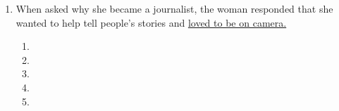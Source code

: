 \begin{enumerate}
\item When asked why she became a journalist, the woman responded that she wanted to help tell people’s stories and \ul{ loved to be on camera.}

\begin{spacing}{2}
\begin{enumerate}[label=(\Alph*)]
\item\hrulefill
\item\hrulefill
\item\hrulefill
\item\hrulefill
\item\hrulefill
\end{enumerate}
\end{spacing}
\end{enumerate}